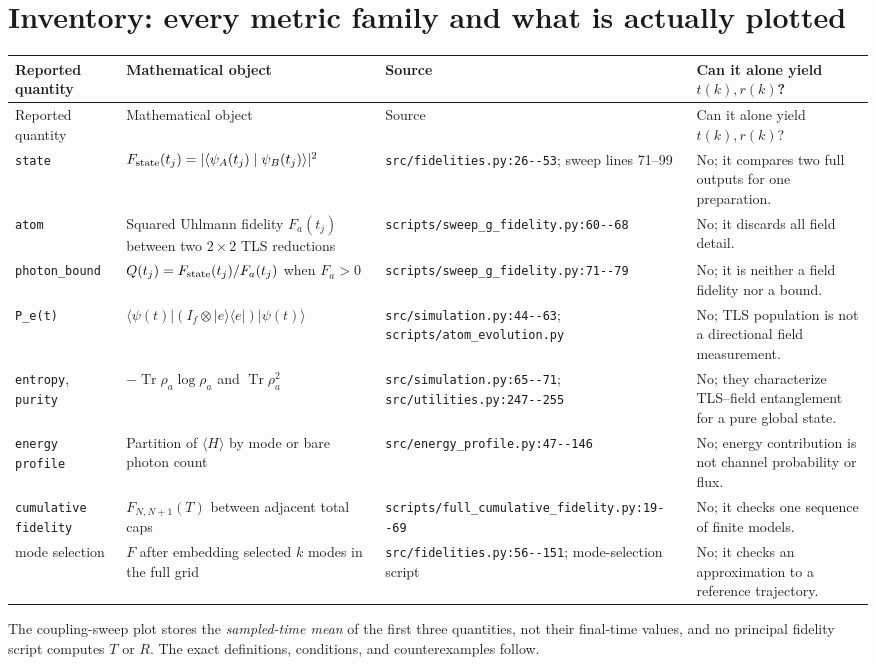 \documentclass[11pt,a4paper]{article}
\newcommand{\ket}[1]{\lvert #1\rangle}
\newcommand{\bra}[1]{\langle #1\rvert}
\newcommand{\braket}[2]{\langle #1\mid #2\rangle}
\newcommand{\code}[1]{\nolinkurl{#1}}
\newcommand{\Tr}{\operatorname{Tr}}
\begin{document}
\section{Inventory: every metric family and what is actually plotted}
\label{sec:inventory}
\begin{center}\scriptsize
\begin{longtable}{p{}p{}p{}p{}}
\toprule Reported quantity & Mathematical object & Source & Can it alone yield $t(k),r(k)$?\\\midrule\endfirsthead
\toprule Reported quantity & Mathematical object & Source & Can it alone yield $t(k),r(k)$?\\\midrule\endhead
\code{state} & $F_{\rm state}(t_j)=|\braket{\psi_A(t_j)}{\psi_B(t_j)}|^2$ & \code{src/fidelities.py:26--53}; sweep lines 71--99 & No; it compares two full outputs for one preparation.\\
\code{atom} & Squared Uhlmann fidelity $F_a(t_j)$ between two $2\times2$ TLS reductions & \code{scripts/sweep_g_fidelity.py:60--68} & No; it discards all field detail.\\
\code{photon_bound} & $Q(t_j)=F_{\rm state}(t_j)/F_a(t_j)$ when $F_a>0$ & \code{scripts/sweep_g_fidelity.py:71--79} & No; it is neither a field fidelity nor a bound.\\
\code{P_e(t)} & $\bra{\psi(t)}(I_f\otimes\ket e\bra e)\ket{\psi(t)}$ & \code{src/simulation.py:44--63}; \code{scripts/atom_evolution.py} & No; TLS population is not a directional field measurement.\\
\code{entropy}, \code{purity} & $-\Tr\rho_a\log\rho_a$ and $\Tr\rho_a^2$ & \code{src/simulation.py:65--71}; \code{src/utilities.py:247--255} & No; they characterize TLS--field entanglement for a pure global state.\\
\code{energy profile} & Partition of $\langle H\rangle$ by mode or bare photon count & \code{src/energy_profile.py:47--146} & No; energy contribution is not channel probability or flux.\\
\code{cumulative fidelity} & $F_{N,N+1}(T)$ between adjacent total caps & \code{scripts/full_cumulative_fidelity.py:19--69} & No; it checks one sequence of finite models.\\
mode selection & $F$ after embedding selected $k$ modes in the full grid & \code{src/fidelities.py:56--151}; mode-selection script & No; it checks an approximation to a reference trajectory.\\
\bottomrule
\end{longtable}
\end{center}
The coupling-sweep plot stores the \emph{sampled-time mean} of the first three quantities, not their final-time values, and no principal fidelity script computes $T$ or $R$. The exact definitions, conditions, and counterexamples follow.
\end{document}
